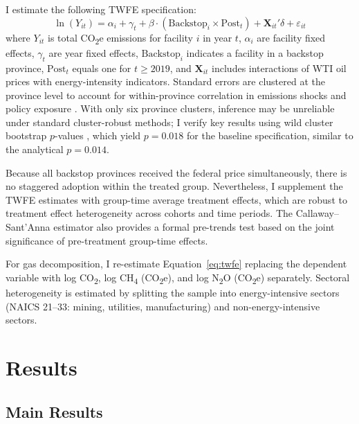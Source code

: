 \documentclass[12pt]{article}
\begin{document}
I estimate the following TWFE specification:
\begin{equation}
\label{eq:twfe}
\ln(Y_{it}) = \alpha_i + \gamma_t + \beta \cdot (\text{Backstop}_i \times \text{Post}_t) + \mathbf{X}_{it}'\delta + \varepsilon_{it}
\end{equation}
where $Y_{it}$ is total CO\textsubscript{2}e emissions for facility $i$ in year $t$, $\alpha_i$ are facility fixed effects, $\gamma_t$ are year fixed effects, $\text{Backstop}_i$ indicates a facility in a backstop province, $\text{Post}_t$ equals one for $t \geq 2019$, and $\mathbf{X}_{it}$ includes interactions of WTI oil prices with energy-intensity indicators. Standard errors are clustered at the province level to account for within-province correlation in emissions shocks and policy exposure \citep{Bertrand2004}. With only six province clusters, inference may be unreliable under standard cluster-robust methods; I verify key results using wild cluster bootstrap $p$-values \citep{Cameron2008}, which yield $p = 0.018$ for the baseline specification, similar to the analytical $p = 0.014$.

Because all backstop provinces received the federal price simultaneously, there is no staggered adoption within the treated group. Nevertheless, I supplement the TWFE estimates with \citet{Callaway2021} group-time average treatment effects, which are robust to treatment effect heterogeneity across cohorts and time periods. The Callaway--Sant'Anna estimator also provides a formal pre-trends test based on the joint significance of pre-treatment group-time effects.

For gas decomposition, I re-estimate Equation~\ref{eq:twfe} replacing the dependent variable with log CO\textsubscript{2}, log CH\textsubscript{4} (CO\textsubscript{2}e), and log N\textsubscript{2}O (CO\textsubscript{2}e) separately. Sectoral heterogeneity is estimated by splitting the sample into energy-intensive sectors (NAICS 21--33: mining, utilities, manufacturing) and non-energy-intensive sectors.


\section{Results}
\label{sec:results}

\subsection{Main Results}


\end{document}
